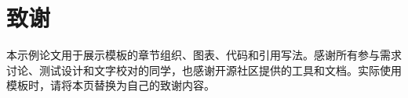 \chapter*{致谢}
本示例论文用于展示模板的章节组织、图表、代码和引用写法。感谢所有参与需求讨论、测试设计和文字校对的同学，也感谢开源社区提供的工具和文档。实际使用模板时，请将本页替换为自己的致谢内容。
